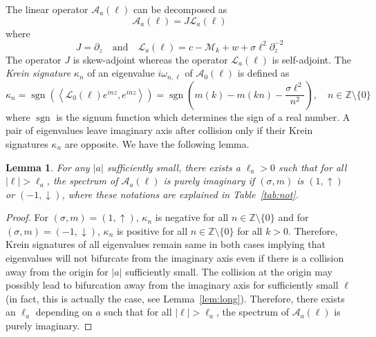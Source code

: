\documentclass[12pt]{amsart}    %
\renewcommand{\L}{\mathcal{L}}
\renewcommand{\k}{\kappa}
\newcommand{\Z}{\mathbb{Z}}
\newcommand{\calM}{\mathcal{M}}
\newcommand{\oneu}{(1,\uparrow)}
\newcommand{\mind}{(-1,\downarrow)}
\newtheorem{lemma}[theorem]{Lemma}
\numberwithin{equation}{section}
\begin{document}
The linear operator $\mathcal A_a(\ell)$ can be decomposed as
\[
\mathcal A_a(\ell) = J \L_a(\ell)
\]
where
\[J = \partial_z \quad \text{and} \quad \L_a(\ell) = c - \calM_k + w + \sigma \ell^2 \partial_z^{-2}
\]
The operator $J$ is skew-adjoint whereas the operator $\L_a(\ell)$ is self-adjoint.
The {\em Krein signature} $\k_n$ of an eigenvalue $i\omega_{n,\ell}$ of $\mathcal A_0(\ell)$ is defined as
\begin{equation}\label{e:krein}
\k_n =  \operatorname{sgn}(\left<\L_0(\ell) e^{inz}, e^{inz}\right>) = \operatorname{sgn}\left(m(k)-m(kn)-\dfrac{\sigma \ell^2}{n^2}\right), \quad n \in \Z \setminus \{0\}
\end{equation}
where $\operatorname{sgn}$ is the signum function which determines the sign of a real number. A pair of eigenvalues  leave imaginary axis after collision only if their Krein signatures $\kappa_n$ are opposite. We have the following lemma. 


\begin{lemma}\label{lem1}  
For any $|a|$ sufficiently small, there exists a $\ell_a >0$ such that for all $|\ell|>\ell_a$, the spectrum of $\mathcal A_a(\ell)$ is purely imaginary if $(\sigma,m)$ is $\oneu$ or $\mind$, where these notations are explained in Table~\ref{tab:not}.
\end{lemma}
\begin{proof}
For $(\sigma,m)=\oneu$, $\k_n$ is negative for all $n\in \Z \setminus \{0\}$ and for $(\sigma,m)=\mind$, $\k_n$ is positive for all $n\in \Z \setminus \{0\}$ for all $k>0$. Therefore, Krein signatures of all eigenvalues remain same in both cases implying  that eigenvalues will not bifurcate from the imaginary axis even if there is a collision away from the origin for $|a|$ sufficiently small. The collision at the origin may possibly lead to bifurcation away from the imaginary axis for sufficiently small $\ell$ (in fact, this is actually the case, see Lemma~\ref{lem:long}). Therefore, there exists an $\ell_a$ depending on $a$ such that for all $|\ell|>\ell_a$, the spectrum of $\mathcal A_a(\ell)$ is purely imaginary.
\end{proof}
\end{document}
